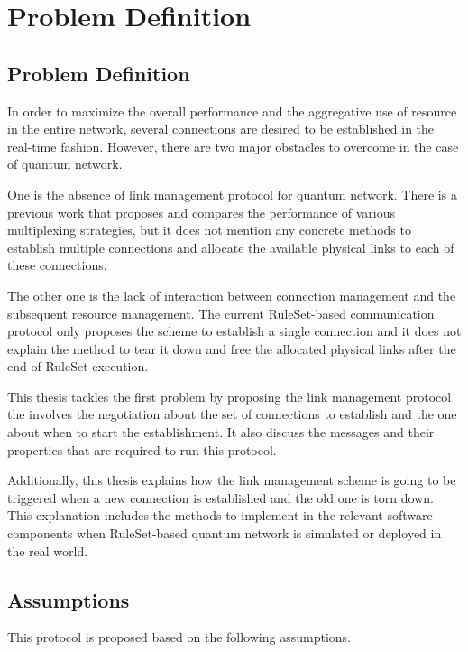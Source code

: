 \chapter{Problem Definition}
\label{problem-definition}

\section{Problem Definition}

In order to maximize the overall performance and the aggregative use of resource in the entire network, several connections are desired to be established in the real-time fashion.
However, there are two major obstacles to overcome in the case of quantum network. 

One is the absence of link management protocol for quantum network. There is a previous work \cite{aparicio2011multiplexing} that proposes and compares the performance of various multiplexing strategies, but it does not mention any concrete methods to establish multiple connections and allocate the available physical links to each of these connections.

The other one is the lack of interaction between connection management and the subsequent resource management. The current RuleSet-based communication protocol \cite{matsuo2019quantum} only proposes the scheme to establish a single connection and it does not explain the method to tear it down and free the allocated physical links after the end of RuleSet execution. 

This thesis tackles the first problem by proposing the link management protocol the involves the negotiation about the set of connections to establish and the one about when to start the establishment. It also discuss the messages and their properties that are required to run this protocol.

Additionally, this thesis explains how the link management scheme is going to be triggered when a new connection is established and the old one is torn down. This explanation includes the methods to implement in the relevant software components when RuleSet-based quantum network is simulated or deployed in the real world.

\section{Assumptions}

This protocol is proposed based on the following assumptions.


